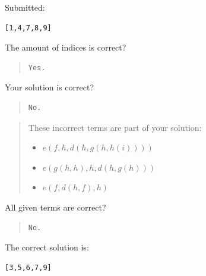 Submitted:


\begin{verbatim}
[1,4,7,8,9]
\end{verbatim}


The amount of indices is correct?

\begin{quote}
\begin{verbatim}
Yes.
\end{verbatim}
\end{quote}

Your solution is correct?

\begin{quote}
\begin{verbatim}
No.
\end{verbatim}
\end{quote}

\begin{quote}These incorrect terms are part of your solution: \begin{itemize}\item{}$\mathit{e(f,h,d(h,g(h,h(i))))}$\item{}$\mathit{e(g(h,h),h,d(h,g(h)))}$\item{}$\mathit{e(f,d(h,f),h)}$\end{itemize}\end{quote}  

All given terms are correct?

\begin{quote}
\begin{verbatim}
No.
\end{verbatim}
\end{quote}

The correct solution is:
\begin{verbatim}
[3,5,6,7,9]
\end{verbatim}


